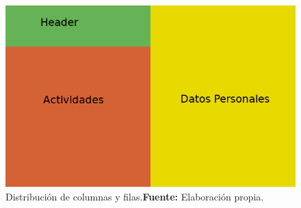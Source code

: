 \begin{figure}[h]
    \includegraphics[width=1\linewidth]{image/grid.png}
    \caption{Distribución de columnas y filas.\newline \textbf{Fuente:} Elaboración propia.}
    \label{fig:image/grid}
\end{figure}
